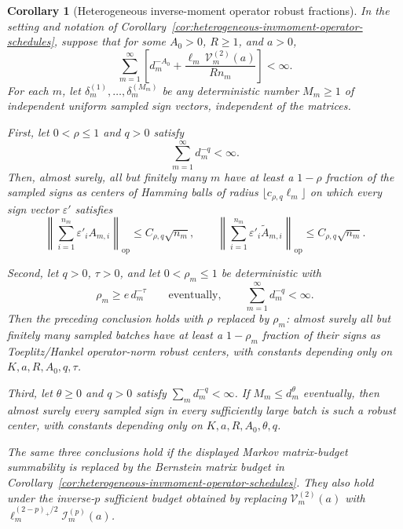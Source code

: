 \documentclass[11pt]{amsart}
\numberwithin{equation}{section}
\newtheorem{corollary}[theorem]{Corollary}
\theoremstyle{definition}
\theoremstyle{remark}
\newcommand{\op}{\mathrm{op}}
\newcommand{\eps}{\varepsilon}
\begin{document}
\begin{corollary}[Heterogeneous inverse-moment operator robust fractions]
\label{cor:heterogeneous-invmoment-operator-fractions}
In the setting and notation of
Corollary~\ref{cor:heterogeneous-invmoment-operator-schedules}, suppose that for
some \(A_0>0\), \(R\ge1\), and \(a>0\),
\[
  \sum_{m=1}^{\infty}
  \left[
    d_m^{-A_0}
    +\frac{\ell_m\,\mathcal V_m^{(2)}(a)}{R n_m}
  \right]<\infty .
\]
For each \(m\), let
\(\delta_m^{(1)},\ldots,\delta_m^{(M_m)}\) be any deterministic number
\(M_m\ge1\) of independent uniform sampled sign vectors, independent of the
matrices.

First, let \(0<\rho\le1\) and \(q>0\) satisfy
\[
  \sum_{m=1}^{\infty}d_m^{-q}<\infty .
\]
Then, almost surely, all but finitely many \(m\) have at least a
\(1-\rho\) fraction of the sampled signs as centers of Hamming balls of radius
\(\lfloor c_{\rho,q}\ell_m\rfloor\) on which every sign vector \(\eps'\)
satisfies
\[
  \left\|\sum_{i=1}^{n_m}\eps'_iA_{m,i}\right\|_{\op}
  \le C_{\rho,q}\sqrt{n_m},
  \qquad
  \left\|\sum_{i=1}^{n_m}\eps'_i\widetilde A_{m,i}\right\|_{\op}
  \le C_{\rho,q}\sqrt{n_m}.
\]

Second, let \(q>0\), \(\tau>0\), and let \(0<\rho_m\le1\) be deterministic with
\[
  \rho_m\ge e\,d_m^{-\tau}
  \qquad\text{eventually},
  \qquad
  \sum_{m=1}^{\infty}d_m^{-q}<\infty .
\]
Then the preceding conclusion holds with \(\rho\) replaced by \(\rho_m\):
almost surely all but finitely many sampled batches have at least a
\(1-\rho_m\) fraction of their signs as Toeplitz/Hankel operator-norm robust
centers, with constants depending only on \(K,a,R,A_0,q,\tau\).

Third, let \(\theta\ge0\) and \(q>0\) satisfy
\(\sum_m d_m^{-q}<\infty\).  If \(M_m\le d_m^\theta\) eventually, then almost
surely every sampled sign in every sufficiently large batch is such a robust
center, with constants depending only on \(K,a,R,A_0,\theta,q\).

The same three conclusions hold if the displayed Markov matrix-budget
summability is replaced by the Bernstein matrix budget in
Corollary~\ref{cor:heterogeneous-invmoment-operator-schedules}.  They also hold
under the inverse-\(p\) sufficient budget obtained by replacing
\(\mathcal V_m^{(2)}(a)\) with
\(\ell_m^{(2-p)_+/2}\mathcal I_m^{(p)}(a)\).
\end{corollary}
\end{document}
